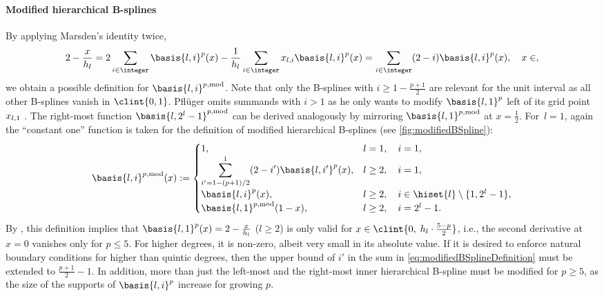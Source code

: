 \paragraph{Modified hierarchical B-splines}

By applying Marsden's identity twice,
\begin{equation}
  \label{eq:modifiedBSplineConstruction}
  2 - \frac{x}{\ms{l}}
  = 2 \sum_{i \in \integer} \basis{l,i}^p(x)
  - \frac{1}{\ms{l}} \sum_{i \in \integer} \gp{l,i} \basis{l,i}^p(x)
  = \sum_{i \in \integer} (2 - i) \basis{l,i}^p(x),\quad
  x \in \real,
\end{equation}
we obtain a possible definition for $\basis{l,i}^{p,\modified}$.
Note that only the B-splines with $i \ge 1 - \tfrac{p+1}{2}$
are relevant for the unit interval as all other B-splines vanish in $\clint{0, 1}$.
Pflüger omits summands with $i > 1$ as he only wants to modify
$\basis{l,1}^p$ left of its grid point $x_{l,1}$ \cite{Pflueger10Spatially}.
The right-most function $\basis{l,2^l-1}^{p,\modified}$ can be derived
analogously by mirroring $\basis{l,1}^{p,\modified}$ at $x = \tfrac{1}{2}$.
For~$l = 1$, again the ``constant one'' function is taken for the definition
of modified hierarchical B-splines (see \cref{fig:modifiedBSpline}):
\begin{equation}
  \label{eq:modifiedBSplineDefinition}
  \basis{l,i}^{p,\modified}(x)
  :=
  \begin{cases}
    1,&
    l = 1,\quad i = 1,\\
    \displaystyle\sum_{i'=1-(p+1)/2}^1 (2 - i') \basis{l,i'}^p(x),&
    l \ge 2,\quad i = 1,\\
    \basis{l,i}^p(x),&
    l \ge 2,\quad i \in \hiset{l} \setminus \{1, 2^l - 1\},\\
    \basis{l,1}^{p,\modified}(1 - x),&
    l \ge 2,\quad i = 2^l - 1.
  \end{cases}
\end{equation}
By ,
this definition implies that
$\basis{l,1}^p(x) = 2 - \tfrac{x}{\ms{l}}$ ($l \ge 2$)
is only valid for $x \in \clint{0,\; \ms{l} \cdot \tfrac{5-p}{2}}$, i.e.,
the second derivative at $x = 0$ vanishes only for $p \le 5$.
For higher degrees, it is non-zero, albeit very small
in its absolute value.
If it is desired to enforce natural boundary conditions
for higher than quintic degrees,
then the upper bound of $i'$ in the sum in \eqref{eq:modifiedBSplineDefinition}
must be extended to $\tfrac{p+1}{2} - 1$.
In addition, more than just the left-most and the right-most inner
hierarchical B-spline must be modified for $p \ge 5$,
as the size of the supports of $\basis{l,i}^p$ increase
for growing $p$.

